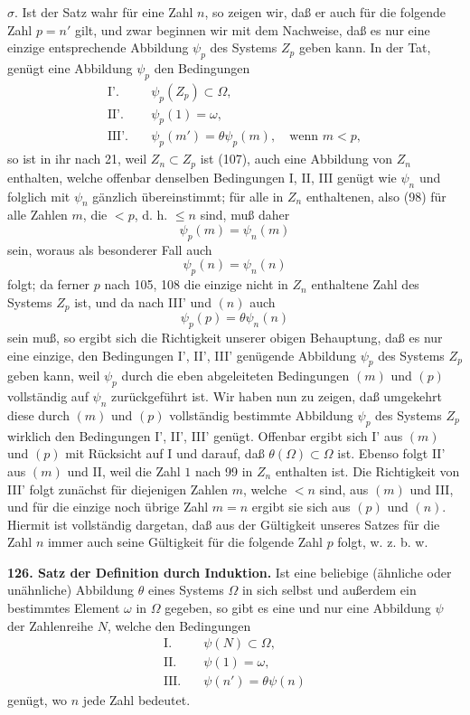 \documentclass[11pt]{article}
\newcommand{\partof}{\mathrel{\subset}}
\begin{document}
\noindent $\sigma.$ Ist der Satz wahr für eine Zahl $n$, so zeigen wir, daß er auch für die folgende Zahl $p=n'$ gilt, und zwar beginnen wir mit dem Nachweise, daß es nur eine einzige entsprechende Abbildung $\psi_p$ des Systems $Z_p$ geben kann. In der Tat, genügt eine Abbildung $\psi_p$ den Bedingungen
\begin{align*}
\text{I'.}\quad& \psi_p(Z_p)\partof\Omega,\\
\text{II'.}\quad& \psi_p(1)=\omega,\\
\text{III'.}\quad& \psi_p(m')=\theta\psi_p(m),\quad \text{wenn }m<p,
\end{align*}
so ist in ihr nach 21, weil $Z_n\partof Z_p$ ist (107), auch eine Abbildung von $Z_n$ enthalten, welche offenbar denselben Bedingungen I, II, III genügt wie $\psi_n$ und folglich mit $\psi_n$ gänzlich übereinstimmt; für alle in $Z_n$ enthaltenen, also (98) für alle Zahlen $m$, die $<p$, d. h. $\leq n$ sind, muß daher
\[
\psi_p(m)=\psi_n(m) \tag{m}
\]
sein, woraus als besonderer Fall auch
\[
\psi_p(n)=\psi_n(n) \tag{n}
\]
folgt; da ferner $p$ nach 105, 108 die einzige nicht in $Z_n$ enthaltene Zahl des Systems $Z_p$ ist, und da nach III' und $(n)$ auch
\[
\psi_p(p)=\theta\psi_n(n) \tag{p}
\]
sein muß, so ergibt sich die Richtigkeit unserer obigen Behauptung, daß es nur eine einzige, den Bedingungen I', II', III' genügende Abbildung $\psi_p$ des Systems $Z_p$ geben kann, weil $\psi_p$ durch die eben abgeleiteten Bedingungen $(m)$ und $(p)$ vollständig auf $\psi_n$ zurückgeführt ist. Wir haben nun zu zeigen, daß umgekehrt diese durch $(m)$ und $(p)$ vollständig bestimmte Abbildung $\psi_p$ des Systems $Z_p$ wirklich den Bedingungen I', II', III' genügt. Offenbar ergibt sich I' aus $(m)$ und $(p)$ mit Rücksicht auf I und darauf, daß $\theta(\Omega)\partof\Omega$ ist. Ebenso folgt II' aus $(m)$ und II, weil die Zahl $1$ nach 99 in $Z_n$ enthalten ist. Die Richtigkeit von III' folgt zunächst für diejenigen Zahlen $m$, welche $<n$ sind, aus $(m)$ und III, und für die einzige noch übrige Zahl $m=n$ ergibt sie sich aus $(p)$ und $(n)$. Hiermit ist vollständig dargetan, daß aus der Gültigkeit unseres Satzes für die Zahl $n$ immer auch seine Gültigkeit für die folgende Zahl $p$ folgt, w. z. b. w.

\noindent\textbf{126. Satz der Definition durch Induktion.} Ist eine beliebige (ähnliche oder unähnliche) Abbildung $\theta$ eines Systems $\Omega$ in sich selbst und außerdem ein bestimmtes Element $\omega$ in $\Omega$ gegeben, so gibt es eine und nur eine Abbildung $\psi$ der Zahlenreihe $N$, welche den Bedingungen
\begin{align*}
\text{I.}\quad& \psi(N)\partof\Omega,\\
\text{II.}\quad& \psi(1)=\omega,\\
\text{III.}\quad& \psi(n')=\theta\psi(n)
\end{align*}
genügt, wo $n$ jede Zahl bedeutet.
\end{document}
